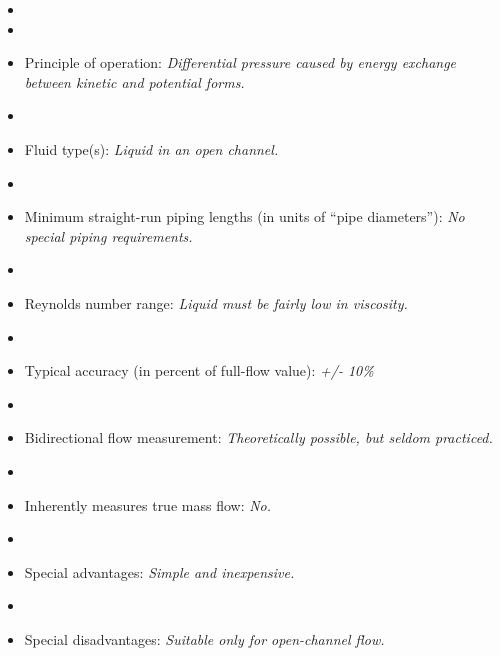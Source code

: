 \documentclass[12pt,a4paper]{article}
\begin{document}
\begin{itemize}
\goodbreak
\item{} 
\vskip 5pt
\item\item{} Principle of operation: {\it Differential pressure caused by energy exchange between kinetic and potential forms.}
\vskip 5pt
\item\item{} Fluid type(s): {\it Liquid in an open channel.}
\vskip 5pt
\item\item{} Minimum straight-run piping lengths (in units of ``pipe diameters''): {\it No special piping requirements.}
\vskip 5pt
\item\item{} Reynolds number range: {\it Liquid must be fairly low in viscosity.}
\vskip 5pt
\item\item{} Typical accuracy (in percent of full-flow value): {\it +/- 10\%}
\vskip 5pt
\item\item{} Bidirectional flow measurement: {\it Theoretically possible, but seldom practiced.}
\vskip 5pt
\item\item{} Inherently measures true mass flow: {\it No.}
\vskip 5pt
\item\item{} Special advantages: {\it Simple and inexpensive.}
\vskip 5pt
\item\item{} Special disadvantages: {\it Suitable only for open-channel flow.}
\end{itemize}
\end{document}
